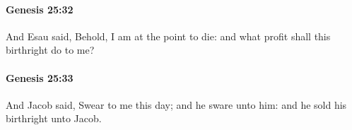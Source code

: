 		\paragraph{Genesis 25:32} %
			\label{GENESIS-25-32}

			And Esau said, Behold, I am at the point to die: and what profit shall this birthright do to me?


		\paragraph{Genesis 25:33} %
			\label{GENESIS-25-33}

			And Jacob said, Swear to me this day; and he sware unto him: and he sold his birthright unto Jacob.


